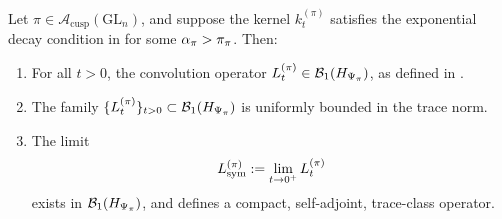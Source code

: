 \begin{lemma}
\label{lem:trace_class_convergence_general}
Let \( \pi \in \mathcal{A}_{\mathrm{cusp}}(\mathrm{GL}_n) \), and suppose the kernel \( k_t^{(\pi)} \) satisfies the exponential decay condition in  for some \( \alpha_{\pi} > \pi_\pi \). Then:
\begin{enumerate}
  \item For all \( t > 0 \), the convolution operator \( L_t^{(\pi)} \in \mathcal{B}_1(H_{\Psi_{\pi}}) \), as defined in .
  \item The family \( \{ L_t^{(\pi)} \}_{t > 0} \subset \mathcal{B}_1(H_{\Psi_{\pi}}) \) is uniformly bounded in the trace norm.
  \item The limit
  \[
  L_{\mathrm{sym}}^{(\pi)} := \lim_{t \to 0^+} L_t^{(\pi)}
  \]
  exists in \( \mathcal{B}_1(H_{\Psi_{\pi}}) \), and defines a compact, self-adjoint, trace-class operator.
\end{enumerate}
\end{lemma}
